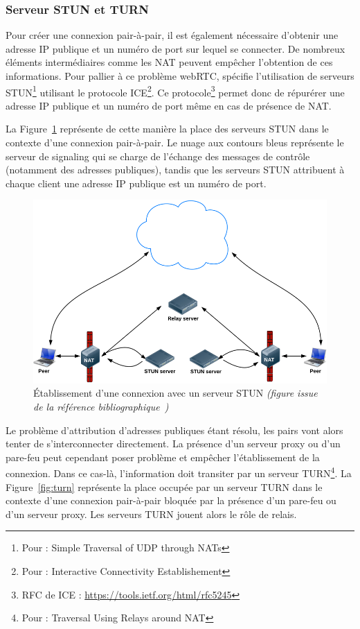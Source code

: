 \documentclass{tnreport}
\begin{document}
\subsubsection{Serveur STUN et TURN}

Pour créer une connexion pair-à-pair, il est également nécessaire d'obtenir une adresse IP publique et un numéro de port sur lequel se connecter. De nombreux éléments intermédiaires comme les NAT peuvent empêcher l'obtention de ces informations. Pour pallier à ce problème webRTC, spécifie l'utilisation de serveurs STUN\footnote{Pour : Simple Traversal of UDP through NATs} utilisant le protocole ICE\footnote{Pour : Interactive Connectivity Establishement}. Ce protocole\footnote{RFC de ICE : \url{https://tools.ietf.org/html/rfc5245}} permet donc de répurérer une adresse IP publique et un numéro de port même en cas de présence de NAT.

La Figure~\ref{fig:stun} représente de cette manière la place des serveurs STUN dans le contexte d'une connexion pair-à-pair. Le nuage aux contours bleus représente le serveur de signaling qui se charge de l'échange des messages de contrôle (notamment des adresses publiques), tandis que les serveurs STUN attribuent à chaque client une adresse IP publique est un numéro de port.

\begin{figure}[!h]
  \centering
  \includegraphics[width=14cm]{figures/stun}
  \caption{Établissement d'une connexion avec un serveur STUN \emph{(figure issue de la référence bibliographique~\cite{GettingStartedwithWebRTC})}}
  \label{fig:stun}
\end{figure}

Le problème d'attribution d'adresses publiques étant résolu, les pairs vont alors tenter de s'interconnecter directement. La présence d'un serveur proxy ou d'un pare-feu peut cependant poser problème et empêcher l'établissement de la connexion. Dans ce cas-là, l'information doit transiter par un serveur TURN\footnote{Pour : Traversal Using Relays around NAT}. La Figure~\ref{fig:turn} représente la place occupée par un serveur TURN dans le contexte d'une connexion pair-à-pair bloquée par la présence d'un pare-feu ou d'un serveur proxy. Les serveurs TURN jouent alors le rôle de relais.
\end{document}
